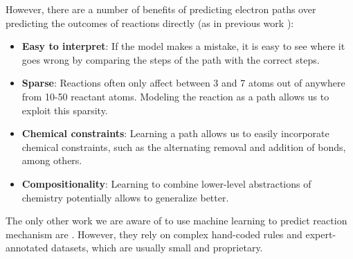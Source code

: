 However, there are a number of benefits of predicting electron paths over predicting the outcomes of reactions directly (as in previous work \cite{jin2017predicting,schwaller2017found}):
\begin{itemize}
\item \textbf{Easy to interpret}: If the model makes a mistake, it is easy to see where it goes wrong by comparing the steps of the path with the correct steps.
\item \textbf{Sparse}: Reactions often only affect between 3 and 7 atoms out of anywhere from 10-50 reactant atoms. Modeling the reaction as a path allows us to exploit this sparsity.
\item \textbf{Chemical constraints}: Learning a path allows us to easily incorporate chemical constraints, such as the alternating removal and addition of bonds, among others.
\item \textbf{Compositionality}: Learning to combine lower-level abstractions of chemistry potentially allows to generalize better.
\end{itemize}
The only other work we are aware of to use machine learning to predict reaction mechanism are \cite{kayala2011learning,kayala2012reactionpredictor}. 
However,
they rely on complex hand-coded rules and expert-annotated datasets, which are usually small and proprietary.

